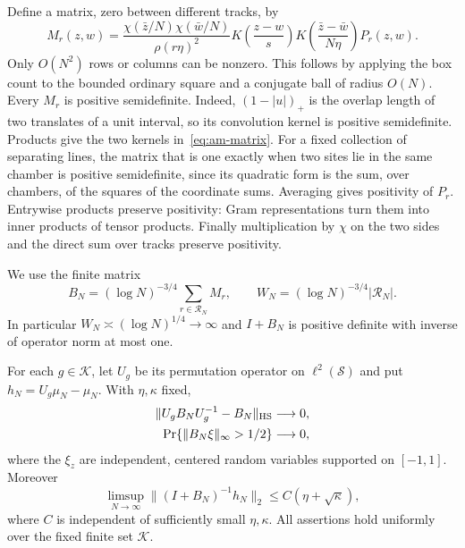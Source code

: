 Define a matrix, zero between different tracks, by
\begin{equation}\label{eq:am-matrix}
 M_r(z,w)=
 \frac{\chi(\bar z/N)\chi(\bar w/N)}{\rho(r\eta)^2}
 K\left(\frac{z-w}{s}\right)
 K\left(\frac{\bar z-\bar w}{N\eta}\right)P_r(z,w).
\end{equation}
Only $O(N^2)$ rows or columns can be nonzero.  This follows by applying the
box count to the bounded ordinary square and a conjugate ball of radius
$O(N)$.  Every $M_r$ is positive semidefinite.  Indeed,
$(1-|u|)_+$ is the overlap length of two translates of a unit interval, so
its convolution kernel is positive semidefinite.  Products give the two
kernels in~\eqref{eq:am-matrix}.  For a fixed collection of separating lines,
the matrix that is one exactly when two sites lie in the same chamber is
positive semidefinite, since its quadratic form is the sum, over chambers,
of the squares of the coordinate sums.  Averaging gives positivity of
$P_r$.  Entrywise products preserve positivity: Gram representations turn
them into inner products of tensor products.  Finally multiplication by
$\chi$ on the two sides and the direct sum over tracks preserve positivity.

We use the finite matrix
\begin{equation}\label{eq:am-B}
 B_N=(\log N)^{-3/4}\sum_{r\in\mathcal R_N}M_r,
 \qquad
 W_N=(\log N)^{-3/4}|\mathcal R_N|.
\end{equation}
In particular $W_N\asymp(\log N)^{1/4}\to\infty$ and $I+B_N$ is
positive definite with inverse of operator norm at most one.

\begin{lemma}\label{lem:am-estimates}
For each $g\in\mathcal K$, let $U_g$ be its permutation operator on
$\ell^2(\mathcal S)$ and put
$h_N=U_g\mu_N-\mu_N$.  With $\eta,\kappa$ fixed,
\begin{align}
 \|U_gB_NU_g^{-1}-B_N\|_{\mathrm{HS}}&\longrightarrow0,
       \label{eq:am-covariance}\\
 \Pr\{\|B_N\xi\|_\infty>1/2\}&\longrightarrow0,
       \label{eq:am-concentration}
\end{align}
where the $\xi_z$ are independent, centered random variables supported on
$[-1,1]$.  Moreover
\begin{equation}\label{eq:am-signal-bound}
 \limsup_{N\to\infty}\|(I+B_N)^{-1}h_N\|_2
       \le C(\eta+\sqrt\kappa),
\end{equation}
where $C$ is independent of sufficiently small $\eta,\kappa$.  All assertions
hold uniformly over the fixed finite set $\mathcal K$.
\end{lemma}

